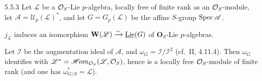 \begin{proposition}{5.5.3}\label{VIIA.5.5.3}
Let $\mathscr L$ be a $\mathcal{O}_S$-Lie $p$-algebra, locally free of finite rank as an $\mathcal{O}_S$-module, let $\mathscr A=\mathscr U_p(\mathscr L)^*$, and let $G=G_p(\mathscr L)$ be the affine $S$-group $\operatorname{Spec}\mathscr A$.
\begin{enumeratei}
\item $j_{\mathscr L}$ induces an isomorphism $\mathbf W(\mathscr L)\xrightarrow{\sim}\underline{\operatorname{Lie}}(G)$ of $\mathbf O_S$-Lie $p$-algebras.
\item Let $\mathscr I$ be the augmentation ideal of $\mathscr A$, and $\omega_G=\mathscr I/\mathscr I^2$ (cf.\ II, 4.11.4). Then $\omega_G$ identifies with $\mathscr L^*=\mathscr H\!om_{\mathcal{O}_S}(\mathscr L,\mathcal{O}_S)$, hence is a locally free $\mathcal{O}_S$-module of finite rank (and one has $\omega_{G/S}^*=\mathscr L$).
\end{enumeratei}
\end{proposition}

